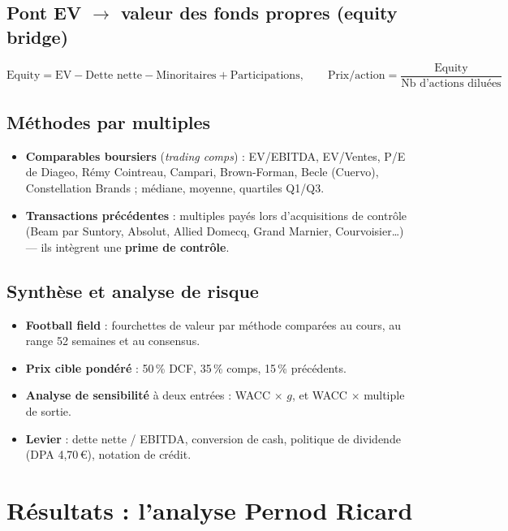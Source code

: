 \documentclass[11pt,a4paper]{article}
\newcommand{\eur}{\,€}
\begin{document}
\subsection{Pont EV $\rightarrow$ valeur des fonds propres (equity bridge)}
\[
\text{Equity} = \text{EV} - \text{Dette nette} - \text{Minoritaires} + \text{Participations},
\qquad \text{Prix/action} = \frac{\text{Equity}}{\text{Nb d'actions diluées}}
\]

\subsection{Méthodes par multiples}
\begin{itemize}
  \item \textbf{Comparables boursiers} (\emph{trading comps}) : EV/EBITDA, EV/Ventes, P/E de
        Diageo, Rémy Cointreau, Campari, Brown-Forman, Becle (Cuervo), Constellation Brands ;
        médiane, moyenne, quartiles Q1/Q3.
  \item \textbf{Transactions précédentes} : multiples payés lors d'acquisitions de contrôle
        (Beam par Suntory, Absolut, Allied Domecq, Grand Marnier, Courvoisier\dots) — ils
        intègrent une \textbf{prime de contrôle}.
\end{itemize}

\subsection{Synthèse et analyse de risque}
\begin{itemize}
  \item \textbf{Football field} : fourchettes de valeur par méthode comparées au cours, au range
        52 semaines et au consensus.
  \item \textbf{Prix cible pondéré} : 50\,\% DCF, 35\,\% comps, 15\,\% précédents.
  \item \textbf{Analyse de sensibilité} à deux entrées : WACC $\times$ $g$, et WACC $\times$
        multiple de sortie.
  \item \textbf{Levier} : dette nette / EBITDA, conversion de cash, politique de dividende
        (DPA 4,70\eur), notation de crédit.
\end{itemize}

\section{Résultats : l'analyse Pernod Ricard}
\end{document}

